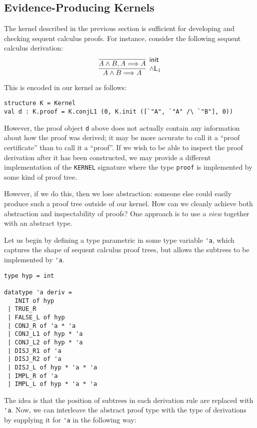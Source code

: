 \documentclass{article}
\newcommand\Seq[2]{{#1}\Longrightarrow{#2}}
\newcommand\Left[1]{{#1}\mathsf{L}}
\newcommand\RuleInit{\mathsf{init}}
\theoremstyle{definition}
\theoremstyle{remark}
\begin{document}
\subsection{Evidence-Producing Kernels}

The kernel described in the previous section is sufficient for
developing and checking sequent calculus proofs. For instance,
consider the following sequent calculus derivation:
\[
  \infer[\Left{\land}_1]{
    \Seq{A\land B}{A}
  }{
    \infer[\RuleInit]{
      \Seq{A\land B, A}{A}
    }{
    }
  }
\]

This is encoded in our kernel as follows:
\begin{verbatim}
structure K = Kernel
val d : K.proof = K.conjL1 (0, K.init ([`"A", `"A" /\ `"B"], 0))
\end{verbatim}

However, the proof object \verb|d| above does not actually contain any
information about how the proof was derived; it may be more accurate
to call it a ``proof certificate'' than to call it a ``proof''. If we
wish to be able to inspect the proof derivation after it has been
constructed, we may provide a different implementation of the
\verb|KERNEL| signature where the type \verb|proof| is implemented by
some kind of proof tree.

However, if we do this, then we lose abstraction: someone else could
easily produce such a proof tree outside of our kernel. How can we
cleanly achieve both abstraction and inspectability of proofs? One
approach is to use a \emph{view} together with an abstract type.

Let us begin by defining a type parametric in some type variable
\verb|'a|, which captures the shape of sequent calculus proof trees,
but allows the subtrees to be implemented by \verb|'a|.

\begin{verbatim}
type hyp = int

datatype 'a deriv =
   INIT of hyp
 | TRUE_R
 | FALSE_L of hyp
 | CONJ_R of 'a * 'a
 | CONJ_L1 of hyp * 'a
 | CONJ_L2 of hyp * 'a
 | DISJ_R1 of 'a
 | DISJ_R2 of 'a
 | DISJ_L of hyp * 'a * 'a
 | IMPL_R of 'a
 | IMPL_L of hyp * 'a * 'a
\end{verbatim}

The idea is that the position of subtrees in each derivation rule are
replaced with \verb|'a|. Now, we can interleave the abstract proof
type with the type of derivations by supplying it for \verb|'a| in the
following way:
\end{document}
